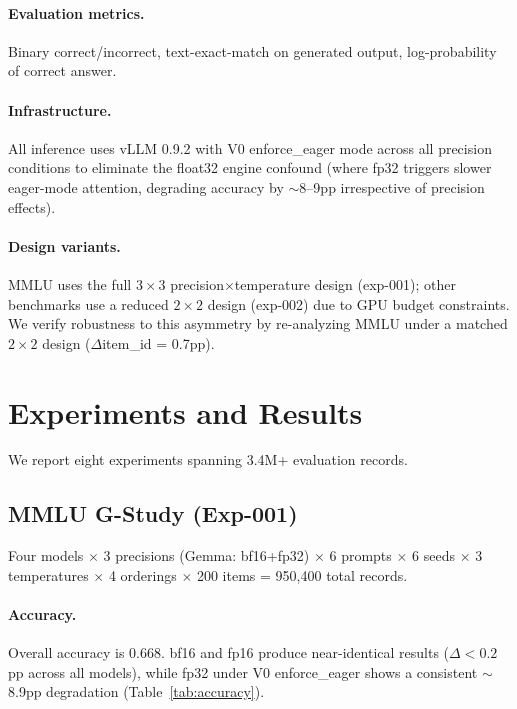 \documentclass[11pt,twocolumn]{article}
\begin{document}
\paragraph{Evaluation metrics.}
Binary correct/incorrect, text-exact-match on generated output, log-probability of correct answer.

\paragraph{Infrastructure.}
All inference uses vLLM 0.9.2 with V0 enforce\_eager mode across all precision conditions to eliminate the float32 engine confound (where fp32 triggers slower eager-mode attention, degrading accuracy by $\sim$8--9pp irrespective of precision effects).

\paragraph{Design variants.}
MMLU uses the full $3 \times 3$ precision$\times$temperature design (exp-001); other benchmarks use a reduced $2 \times 2$ design (exp-002) due to GPU budget constraints.
We verify robustness to this asymmetry by re-analyzing MMLU under a matched $2 \times 2$ design ($\Delta$item\_id = 0.7pp).

\section{Experiments and Results}

We report eight experiments spanning 3.4M+ evaluation records.

\subsection{MMLU G-Study (Exp-001)}
\label{sec:exp001}

Four models $\times$ 3 precisions (Gemma: bf16+fp32) $\times$ 6 prompts $\times$ 6 seeds $\times$ 3 temperatures $\times$ 4 orderings $\times$ 200 items = 950{,}400 total records.

\paragraph{Accuracy.}
Overall accuracy is 0.668. bf16 and fp16 produce near-identical results ($\Delta < 0.2$pp across all models), while fp32 under V0 enforce\_eager shows a consistent $\sim$8.9pp degradation (Table~\ref{tab:accuracy}).
\end{document}
